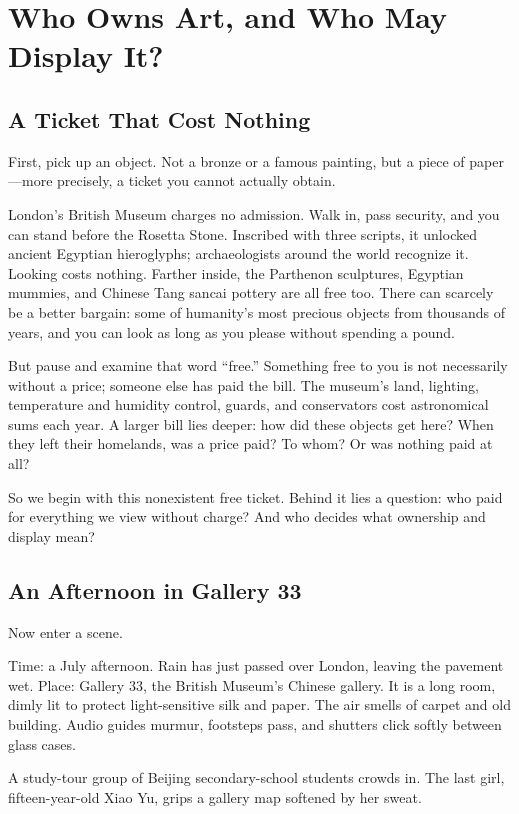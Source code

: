 \chapter[Who Owns and Displays Art?]{Who Owns Art, and Who May Display It?}
\section{A Ticket That Cost Nothing}
First, pick up an object. Not a bronze or a famous painting, but a piece of paper---more precisely, a ticket you cannot actually obtain.

London's British Museum charges no admission. Walk in, pass security, and you can stand before the Rosetta Stone. Inscribed with three scripts, it unlocked ancient Egyptian hieroglyphs; archaeologists around the world recognize it. Looking costs nothing. Farther inside, the Parthenon sculptures, Egyptian mummies, and Chinese Tang sancai pottery are all free too. There can scarcely be a better bargain: some of humanity's most precious objects from thousands of years, and you can look as long as you please without spending a pound.

But pause and examine that word ``free.'' Something free to you is not necessarily without a price; someone else has paid the bill. The museum's land, lighting, temperature and humidity control, guards, and conservators cost astronomical sums each year. A larger bill lies deeper: how did these objects get here? When they left their homelands, was a price paid? To whom? Or was nothing paid at all?

So we begin with this nonexistent free ticket. Behind it lies a question: who paid for everything we view without charge? And who decides what ownership and display mean?

\section{An Afternoon in Gallery 33}
Now enter a scene.

Time: a July afternoon. Rain has just passed over London, leaving the pavement wet. Place: Gallery 33, the British Museum's Chinese gallery. It is a long room, dimly lit to protect light-sensitive silk and paper. The air smells of carpet and old building. Audio guides murmur, footsteps pass, and shutters click softly between glass cases.

A study-tour group of Beijing secondary-school students crowds in. The last girl, fifteen-year-old Xiao Yu, grips a gallery map softened by her sweat.

